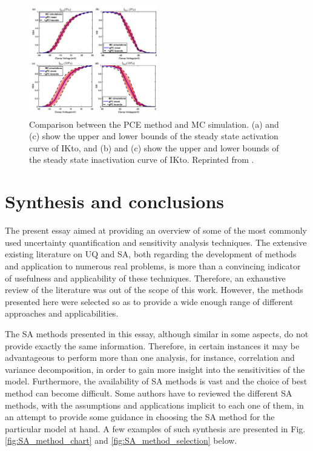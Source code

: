 \documentclass[12pt]{article}
\begin{document}
{\begin{figure}
	\centering
	\includegraphics[width=0.5\textwidth]{images/Hu.png}
	\caption{Comparison between the PCE method and MC simulation. (a) and (c) show the upper and lower bounds of the steady state activation curve of IKto, and (b) and (c) show the upper and lower bounds of the steady state inactivation curve of IKto. Reprinted from \cite{HU201857}.}
	\label{fig:Hu}
\end{figure}

\FloatBarrier

\section{Synthesis and conclusions}

The present essay aimed at providing an overview of some of the most commonly used uncertainty quantification and sensitivity analysis techniques.  The extensive existing literature on UQ and SA, both regarding the development of methods and application to numerous real problems, is more than a convincing indicator of usefulness and applicability of these techniques. Therefore, an exhaustive review of the literature was out of the scope of this work. However, the methods presented here were selected so as to provide a wide enough range of different approaches and applicabilities.  

The SA methods presented in this essay, although similar in some aspects, do not provide exactly the same information. Therefore, in certain instances it may be advantageous to perform more than one analysis, for instance, correlation and variance decomposition, in order to gain more insight into the sensitivities of the model. Furthermore, the availability of SA methods is vast and the choice of best method can become difficult. Some authors have to reviewed the different SA methods, with the assumptions and applications implicit to each one of them, in an attempt to provide some guidance in choosing the SA method for the particular model at hand. A few examples of such synthesis are presented in Fig. \ref{fig:SA_method_chart} and \ref{fig:SA_method_selection} below. 

}
\end{document}
